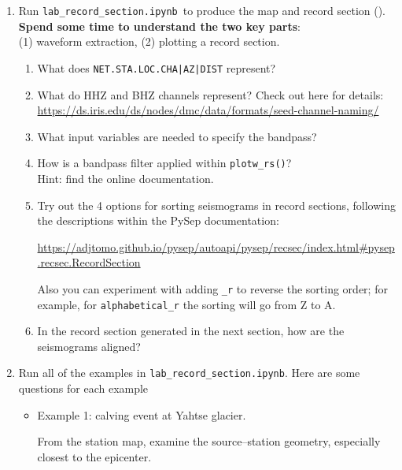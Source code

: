 \documentclass[11pt,titlepage,fleqn]{article}
\newcommand{\tfile}{{\tt lab\_record\_section.ipynb}}
\begin{document}
\begin{enumerate}

\item Run \tfile\ to produce the map and record section (). \\
{\bf Spend some time to understand the two key parts}: \\
(1) waveform extraction, (2) plotting a record section.
%
\begin{enumerate}
\item What does \verb+NET.STA.LOC.CHA|AZ|DIST+ represent?

\item What do HHZ and BHZ channels represent? Check out here for details: \\
\url{https://ds.iris.edu/ds/nodes/dmc/data/formats/seed-channel-naming/}

\item What input variables are needed to specify the bandpass? 

\item How is a bandpass filter applied within \verb+plotw_rs()+? \\
Hint: find the online documentation.

\item Try out the 4 options for sorting seismograms in record sections, following the descriptions within the PySep documentation:

\scriptsize
\url{https://adjtomo.github.io/pysep/autoapi/pysep/recsec/index.html#pysep.recsec.RecordSection}
\normalsize

Also you can experiment with adding \verb+_r+ to reverse the sorting order; for example, for \verb+alphabetical_r+ the sorting will go from Z to A.

\item In the record section generated in the next section, how are the seismograms aligned?

\end{enumerate}


\item Run all of the examples in \tfile. Here are some questions for each example
%
\begin{itemize}
\item Example 1: calving event at Yahtse glacier. 

From the station map, examine the source--station geometry, especially closest to the epicenter.


\end{itemize}
\end{enumerate}
\end{document}

